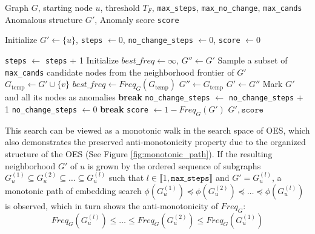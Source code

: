 \documentclass[pdflatex,sn-mathphys-num]{sn-jnl}%
\theoremstyle{thmstyleone}%
\theoremstyle{thmstyletwo}%
\theoremstyle{thmstylethree}%
\begin{document}
\begin{algorithm}[H]
\caption{Greedy Search for Anomalous Structures}
\label{algo:algo}
\scriptsize
\begin{algorithmic}[1]
\Require Graph $G$, starting node $u$, threshold $T_F$, \texttt{max\_steps}, \texttt{max\_no\_change}, \texttt{max\_cands}
\Ensure Anomalous structure $G'$, Anomaly score \texttt{score}

\State Initialize $G' \gets \{u\}$, \texttt{steps} $\gets 0$, \texttt{no\_change\_steps} $\gets 0$, \texttt{score} $\gets 0$

    \State \texttt{steps} $\gets$ \texttt{steps} + 1
    \State Initialize $best\_freq \gets \infty$, $G'' \gets G'$
    \State Sample a subset of \texttt{max\_cands} candidate nodes from the neighborhood frontier of $G'$ \label{line:sampling}
        \State $G_{\text{temp}} \gets G' \cup \{v\}$
            \State $best\_freq \gets Freq_G(G_{\text{temp}})$
            \State $G'' \gets G_{\text{temp}}$
        \EndIf
    \EndFor
    \State $G' \gets G''$
        \State Mark $G'$ and all its nodes as anomalies
        \State \textbf{break}
    \EndIf
        \State \texttt{no\_change\_steps} $\gets$ \texttt{no\_change\_steps} + 1
    \Else
        \State \texttt{no\_change\_steps} $\gets 0$
    \EndIf
        \State \textbf{break}
    \EndIf
\EndWhile
\State \texttt{score} $\gets 1 - Freq_G(G')$
\Return $G', \texttt{score}$
\end{algorithmic}
\end{algorithm}


\vspace{10pt}

This search can be viewed as a monotonic walk in the search space of OES, which also demonstrates the preserved anti-monotonicity property due to the organized structure of the OES (See Figure \ref{fig:monotonic_path}). If the resulting neighborhood $G'$ of $u$ is grown by the ordered sequence of subgraphs $G^{(1)}_u \subseteq G^{(2)}_u \subseteq \dots \subseteq G^{(l)}_u$ such that $l \in \llbracket 1, \texttt{max\_steps} \rrbracket$ and $G' = G^{(l)}_u$, a monotonic path of embedding search $\phi(G^{(1)}_u) \preceq \phi(G^{(2)}_u) \preceq \dots \preceq \phi(G^{(l)}_u)$ is observed, which in turn shows the anti-monotonicity of $Freq_G$: \[Freq_G(G^{(l)}_u) \le \dots \le Freq_G(G^{(2)}_u) \le Freq_G(G^{(1)}_u)\]
\end{document}
